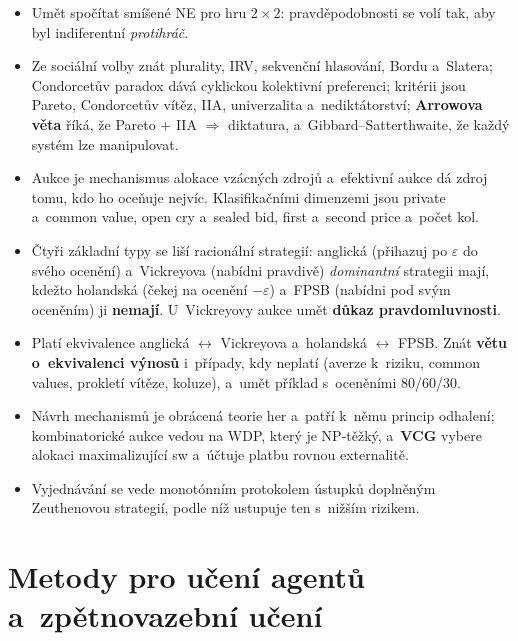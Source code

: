 \documentclass[11pt,a4paper]{article}
\theoremstyle{definition}
\begin{document}
\begin{itemize}
  strukturu má tragedy of the commons. U~iterovaného PD se uplatní stín budoucnosti a~Axelrodova
  TFT, která je slušná, odvetná, odpouštějící, nezávistivá a~srozumitelná.
\item Umět spočítat smíšené NE pro hru $2\times2$: pravděpodobnosti se volí tak, aby byl
  indiferentní \emph{protihráč}.
\item Ze sociální volby znát plurality, IRV, sekvenční hlasování, Bordu a~Slatera; Condorcetův
  paradox dává cyklickou kolektivní preferenci; kritérii jsou Pareto, Condorcetův vítěz, IIA,
  univerzalita a~nediktátorství; \textbf{Arrowova věta} říká, že Pareto + IIA $\Rightarrow$
  diktatura, a~Gibbard--Satterthwaite, že každý systém lze manipulovat.
\item Aukce je mechanismus alokace vzácných zdrojů a~efektivní aukce dá zdroj tomu, kdo ho
  oceňuje nejvíc. Klasifikačními dimenzemi jsou private a~common value, open cry a~sealed bid,
  first a~second price a~počet kol.
\item Čtyři základní typy se liší racionální strategií: anglická (přihazuj po $\varepsilon$
  do svého ocenění) a~Vickreyova (nabídni pravdivě) \emph{dominantní} strategii mají, kdežto
  holandská (čekej na ocenění $-\varepsilon$) a~FPSB (nabídni pod svým oceněním) ji
  \textbf{nemají}. U~Vickreyovy aukce umět \textbf{důkaz pravdomluvnosti}.
\item Platí ekvivalence anglická $\leftrightarrow$ Vickreyova a~holandská $\leftrightarrow$ FPSB.
  Znát \textbf{větu o~ekvivalenci výnosů} i~případy, kdy neplatí (averze k~riziku, common values,
  prokletí vítěze, koluze), a~umět příklad s~oceněními 80/60/30.
\item Návrh mechanismů je obrácená teorie her a~patří k~němu princip odhalení; kombinatorické
  aukce vedou na WDP, který je NP-těžký, a~\textbf{VCG} vybere alokaci maximalizující sw
  a~účtuje platbu rovnou externalitě.
\item Vyjednávání se vede monotónním protokolem ústupků doplněným Zeuthenovou strategií, podle
  níž ustupuje ten s~nižším rizikem.
\end{itemize}


\section{Metody pro učení agentů a~zpětnovazební učení}
\label{sec:uceni}
\end{document}
